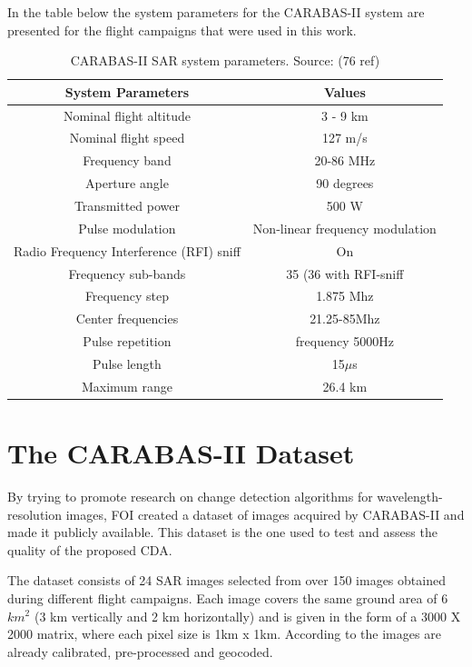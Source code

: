 In the table below the system parameters for the CARABAS-II system are presented for the
flight campaigns that were used in this work. 

\begin{table}[h]
    \centering
    \begin{tabular}{|c|c|}
        \hline
        System Parameters & Values \\ \hline
        Nominal flight altitude & 3 - 9 km \\ \hline
        Nominal flight speed & 127 m/s \\ \hline
        Frequency band & 20-86 MHz \\ \hline
        Aperture angle & 90 degrees \\ \hline
        Transmitted power & 500 W \\ \hline
        Pulse modulation & Non-linear frequency modulation \\ \hline
        Radio Frequency Interference (RFI) sniff & On \\ \hline
        Frequency sub-bands & 35 (36 with RFI-sniff \\ \hline
        Frequency step & 1.875 Mhz \\ \hline
        Center frequencies & 21.25-85Mhz \\ \hline
        Pulse repetition & frequency 5000Hz \\ \hline
        Pulse length & 15$\mu$s \\ \hline
        Maximum range & 26.4 km \\ \hline
    \end{tabular}
    \caption{CARABAS-II SAR system parameters. Source: (76 ref)}
    \label{tab:carabas_system}
\end{table}

\section{The CARABAS-II Dataset}

By trying to promote research on change detection algorithms for wavelength-resolution
images, FOI created a dataset of images acquired by CARABAS-II and made it publicly available. 
This dataset is the one used to test and assess the quality of the proposed CDA.

The dataset consists of 24 SAR images selected from over 150 images obtained during different flight campaigns.
Each image covers the same ground area of 6 $km^2$ (3 km vertically and 2 km horizontally)
and is given in the form of a 3000 X 2000 matrix, where each pixel size is 1km x 1km.
According to \cite{ 77,62,78} the images are already calibrated, pre-processed and geocoded.

